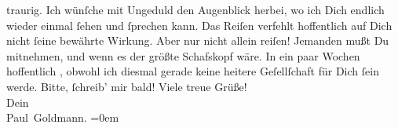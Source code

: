 \begin{ledgroupsized}[t]{13cm}
               traurig. Ich wünſche mit Ungeduld den Augenblick herbei, wo ich Dich endlich wieder
               einmal  ſehen und ſprechen kann. Das Reiſen verfehlt hoffentlich auf Dich nicht ſeine
               bewährte Wirkung. Aber nur nicht allein reiſen! Jemanden mußt Du mitnehmen, und wenn
               es der größte Schafskopf wäre. In ein paar Wochen hoffentlich \label{K_L02878-6v}\label{K_L02878-6h},
                  \strikeout{\textcolor{gray}{×}\-\textcolor{gray}{×}} obwohl ich diesmal gerade keine heitere Geſellſchaft für Dich ſein werde.\pend
           \pstart
           Bitte, ſchreib’ mir bald!\pend
           \pstart
           Viele treue Grüße! {\\[\baselineskip]}Dein {\\[\baselineskip]}\spacefill\mbox{Paul Goldmann.}\pend
           \leftskip=0em{}
         
         \endnumbering{}\end{ledgroupsized}  \newcommand{\dateiname}{L02878}\newcommand{\titel}{Paul Goldmann an Arthur Schnitzler, 2. 7. 1899}\newcommand{\editorInnen}{Martin Anton Müller und Laura Untner}
      